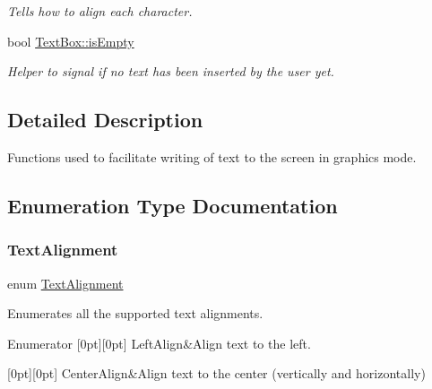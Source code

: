 \begin{DoxyCompactItemize}
\begin{DoxyCompactList}\small\item\em Tells how to align each character. \end{DoxyCompactList}\item 
bool \mbox{\hyperlink{group__textbox_gad8bde595ae368fa4850cb6c05d153957}{Text\+Box\+::is\+Empty}}
\begin{DoxyCompactList}\small\item\em Helper to signal if no text has been inserted by the user yet. \end{DoxyCompactList}\end{DoxyCompactItemize}


\subsection{Detailed Description}
Functions used to facilitate writing of text to the screen in graphics mode. 

\subsection{Enumeration Type Documentation}
\mbox{\label{group__textbox_gaa56f1a82069b5feeadbb4591cb3e474f}} 
\subsubsection{\texorpdfstring{Text\+Alignment}{TextAlignment}}
{\footnotesize\ttfamily enum \mbox{\hyperlink{group__textbox_gaa56f1a82069b5feeadbb4591cb3e474f}{Text\+Alignment}}}



Enumerates all the supported text alignments. 

\begin{DoxyEnumFields}{Enumerator}
[0pt][0pt]{}\mbox{\label{group__textbox_ggaa56f1a82069b5feeadbb4591cb3e474fafc8c04fa2a5fd53f6e74b8327a6bf5f5}} 
Left\+Align&Align text to the left. \\
\hline

[0pt][0pt]{}\mbox{\label{group__textbox_ggaa56f1a82069b5feeadbb4591cb3e474fa688bcbcbf29b99bd4614560bc2b17bdf}} 
Center\+Align&Align text to the center (vertically and horizontally) \\
\hline

\end{DoxyEnumFields}


